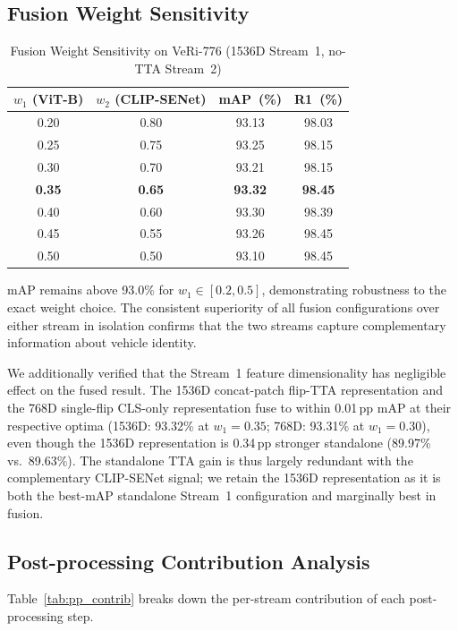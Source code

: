 \documentclass[11pt]{article}
\begin{document}
\subsection{Fusion Weight Sensitivity}

\begin{table}[!t]
  \centering
  \caption{Fusion Weight Sensitivity on VeRi-776 (1536D Stream~1,
    no-TTA Stream~2)}
  \label{tab:fusion_sweep}
  \begin{tabular}{cccc}
    \toprule
    $w_1$ (ViT-B) & $w_2$ (CLIP-SENet) & mAP~(\%) & R1~(\%) \\
    \midrule
    0.20 & 0.80 & 93.13 & 98.03 \\
    0.25 & 0.75 & 93.25 & 98.15 \\
    0.30 & 0.70 & 93.21 & 98.15 \\
    \textbf{0.35} & \textbf{0.65} & \textbf{93.32} & \textbf{98.45} \\
    0.40 & 0.60 & 93.30 & 98.39 \\
    0.45 & 0.55 & 93.26 & 98.45 \\
    0.50 & 0.50 & 93.10 & 98.45 \\
    \bottomrule
  \end{tabular}
\end{table}

mAP remains above 93.0\% for $w_1 \in [0.2, 0.5]$, demonstrating robustness
to the exact weight choice. The consistent superiority of all fusion
configurations over either stream in isolation confirms that the two streams
capture complementary information about vehicle identity.

We additionally verified that the Stream~1 feature dimensionality has
negligible effect on the fused result. The 1536D concat-patch flip-TTA
representation and the 768D single-flip CLS-only representation fuse to
within 0.01\,pp mAP at their respective optima (1536D: 93.32\% at
$w_1{=}0.35$; 768D: 93.31\% at $w_1{=}0.30$), even though the 1536D
representation is 0.34\,pp stronger standalone (89.97\% vs.\ 89.63\%). The
standalone TTA gain is thus largely redundant with the complementary
CLIP-SENet signal; we retain the 1536D representation as it is both the
best-mAP standalone Stream~1 configuration and marginally best in fusion.

\subsection{Post-processing Contribution Analysis}

Table~\ref{tab:pp_contrib} breaks down the per-stream contribution of each
post-processing step.
\end{document}
